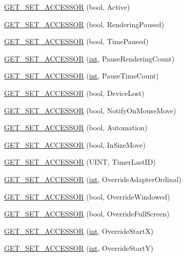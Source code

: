 \begin{DoxyCompactItemize}
\item 
\hyperlink{class_d_x_u_t_state_a86fa93ddd4667d88896569250f131444}{GET\_\-SET\_\-ACCESSOR} (bool, Active)
\item 
\hyperlink{class_d_x_u_t_state_a1201e10a8729dec22b252ff1682a46c0}{GET\_\-SET\_\-ACCESSOR} (bool, RenderingPaused)
\item 
\hyperlink{class_d_x_u_t_state_a2b593e9cf8d3cbb8158b45ff051a33e7}{GET\_\-SET\_\-ACCESSOR} (bool, TimePaused)
\item 
\hyperlink{class_d_x_u_t_state_a458e562a6427b58eb4d41dc932888b07}{GET\_\-SET\_\-ACCESSOR} (\hyperlink{_d_x_u_tgui_8cpp_a2d77ed03302b6978834ee3b6f57837fb}{int}, PauseRenderingCount)
\item 
\hyperlink{class_d_x_u_t_state_a13cadfb38e001bbb14292eb6aae1a03c}{GET\_\-SET\_\-ACCESSOR} (\hyperlink{_d_x_u_tgui_8cpp_a2d77ed03302b6978834ee3b6f57837fb}{int}, PauseTimeCount)
\item 
\hyperlink{class_d_x_u_t_state_a8157a0e71d8bf110321f863669395df0}{GET\_\-SET\_\-ACCESSOR} (bool, DeviceLost)
\item 
\hyperlink{class_d_x_u_t_state_a630e216973e43a6ca8a58fb920ff57e5}{GET\_\-SET\_\-ACCESSOR} (bool, NotifyOnMouseMove)
\item 
\hyperlink{class_d_x_u_t_state_a723ae3207d893c922cd9c6d2ff029f60}{GET\_\-SET\_\-ACCESSOR} (bool, Automation)
\item 
\hyperlink{class_d_x_u_t_state_a4f607198bc37270086456d147197c6a1}{GET\_\-SET\_\-ACCESSOR} (bool, InSizeMove)
\item 
\hyperlink{class_d_x_u_t_state_a6922427e890b6e63324c96a19df3858e}{GET\_\-SET\_\-ACCESSOR} (UINT, TimerLastID)
\item 
\hyperlink{class_d_x_u_t_state_a7cbe2c1ea6f043e22f885897980ec6d5}{GET\_\-SET\_\-ACCESSOR} (\hyperlink{_d_x_u_tgui_8cpp_a2d77ed03302b6978834ee3b6f57837fb}{int}, OverrideAdapterOrdinal)
\item 
\hyperlink{class_d_x_u_t_state_aeca780e3adb83245c49adbe25fc9890d}{GET\_\-SET\_\-ACCESSOR} (bool, OverrideWindowed)
\item 
\hyperlink{class_d_x_u_t_state_a52534b577cfed421132eb0dadd278204}{GET\_\-SET\_\-ACCESSOR} (bool, OverrideFullScreen)
\item 
\hyperlink{class_d_x_u_t_state_a2f73719a7d7f24a4225b3e52a37ede27}{GET\_\-SET\_\-ACCESSOR} (\hyperlink{_d_x_u_tgui_8cpp_a2d77ed03302b6978834ee3b6f57837fb}{int}, OverrideStartX)
\item 
\hyperlink{class_d_x_u_t_state_ad98c1abb28d4379b55f0f4ffb3191f29}{GET\_\-SET\_\-ACCESSOR} (\hyperlink{_d_x_u_tgui_8cpp_a2d77ed03302b6978834ee3b6f57837fb}{int}, OverrideStartY)

\end{DoxyCompactItemize}
